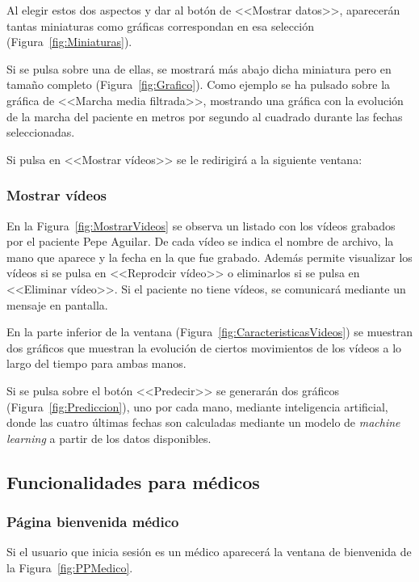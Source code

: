     Al elegir estos dos aspectos y dar al botón de <<Mostrar datos>>, aparecerán tantas miniaturas como gráficas correspondan en esa selección (Figura~\ref{fig:Miniaturas}).

    Si se pulsa sobre una de ellas, se mostrará más abajo dicha miniatura pero en tamaño completo (Figura~\ref{fig:Grafico}). Como ejemplo se ha pulsado sobre la gráfica de <<Marcha media filtrada>>, mostrando una gráfica con la evolución de la marcha del paciente en metros por segundo al cuadrado durante las fechas seleccionadas.


    Si pulsa en <<Mostrar vídeos>> se le redirigirá a la siguiente ventana:
    
    \subsubsection{Mostrar vídeos}
    En la Figura~\ref{fig:MostrarVideos} se observa un listado con los vídeos grabados por el paciente Pepe Aguilar. De cada vídeo se indica el nombre de archivo, la mano que aparece y la fecha en la que fue grabado. Además permite visualizar los vídeos si se pulsa en <<Reprodcir vídeo>> o eliminarlos si se pulsa en <<Eliminar vídeo>>. Si el paciente no tiene vídeos, se comunicará mediante un mensaje en pantalla.

    En la parte inferior de la ventana (Figura~\ref{fig:CaracteristicasVideos}) se muestran dos gráficos que muestran la evolución de ciertos movimientos de los vídeos a lo largo del tiempo para ambas manos.

    Si se pulsa sobre el botón <<Predecir>> se generarán dos gráficos (Figura~\ref{fig:Prediccion}), uno por cada mano, mediante inteligencia artificial, donde las cuatro últimas fechas son calculadas mediante un modelo de \textit{machine learning} a partir de los datos disponibles.

    
\subsection{Funcionalidades para médicos}
    \subsubsection{Página bienvenida médico}
    Si el usuario que inicia sesión es un médico aparecerá la ventana de bienvenida de la Figura~\ref{fig:PPMedico}.
    
